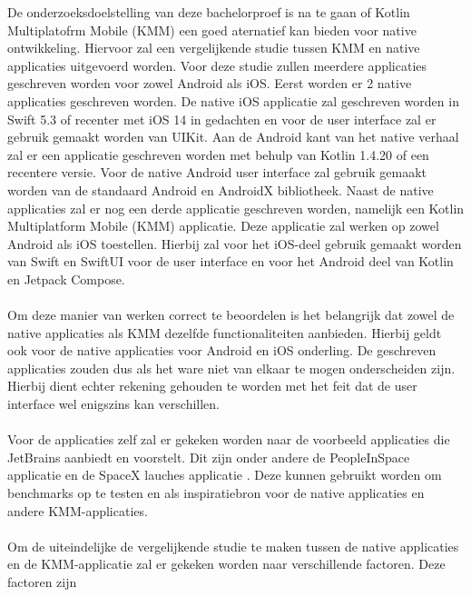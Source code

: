 De onderzoeksdoelstelling van deze bachelorproef is na te gaan of Kotlin Multiplatofrm Mobile (KMM) een goed aternatief kan bieden voor native ontwikkeling. Hiervoor zal een vergelijkende studie tussen KMM en native applicaties uitgevoerd worden. Voor deze studie zullen meerdere applicaties geschreven worden voor zowel Android als iOS. Eerst worden er 2 native applicaties geschreven worden. De native iOS applicatie zal geschreven worden in Swift 5.3 of recenter met iOS 14 in gedachten en voor de user interface zal er gebruik gemaakt worden van UIKit. Aan de Android kant van het native verhaal zal er een applicatie geschreven worden met behulp van Kotlin 1.4.20 of een recentere versie. Voor de native Android user interface zal gebruik gemaakt worden van de standaard Android en AndroidX bibliotheek. Naast de native applicaties zal er nog een derde applicatie geschreven worden, namelijk een Kotlin Multiplatform Mobile (KMM) applicatie. Deze applicatie zal werken op zowel Android als iOS toestellen. Hierbij zal voor het iOS-deel gebruik gemaakt worden van Swift en SwiftUI voor de user interface en voor het Android deel van Kotlin en Jetpack Compose.
\\ \\
Om deze manier van werken correct te beoordelen is het belangrijk dat zowel de native applicaties als KMM dezelfde functionaliteiten aanbieden. Hierbij geldt ook voor de native applicaties voor Android en iOS onderling. De geschreven applicaties zouden dus als het ware niet van elkaar te mogen onderscheiden zijn. Hierbij dient echter rekening gehouden te worden met het feit dat de user interface wel enigszins kan verschillen.
\\ \\
Voor de applicaties zelf zal er gekeken worden naar de voorbeeld applicaties die JetBrains aanbiedt en voorstelt. Dit zijn onder andere de PeopleInSpace applicatie \autocite{OReilly2021} en de SpaceX lauches applicatie \autocite{Kotlin2020HandsOn}. Deze kunnen gebruikt worden om benchmarks op te testen en als inspiratiebron voor de native applicaties en andere KMM-applicaties.
\\ \\
Om de uiteindelijke de vergelijkende studie te maken tussen de native applicaties en de KMM-applicatie zal er gekeken worden naar verschillende factoren. Deze factoren zijn
